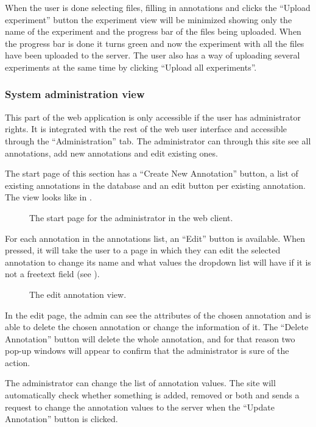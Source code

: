 When the user is done selecting files, filling in annotations and clicks the “Upload experiment” button the experiment view will be minimized showing only the name of the experiment and the progress bar of the files being uploaded. When the progress bar is done it turns green and now the experiment with all the files have been uploaded to the server. The user also has a way of uploading several experiments at the same time by clicking “Upload all experiments”. 

\subsubsection{System administration view}

This part of the web application is only accessible if the user has administrator rights. It is integrated with the rest of the web user interface and accessible through the “Administration” tab. The administrator can through this site see all annotations, add new annotations and edit existing ones.

The start page of this section has a “Create New Annotation” button, a list of existing annotations in the database and an edit button per existing annotation. The view looks like in . 

\begin{figure}[h]
 \caption{The start page for the administrator in the web client.}
 \label{adm__web_annotationView}
\end{figure}

For each annotation in the annotations list, an “Edit” button is available. When pressed, it will take the user to a page in which they can edit the selected annotation to change its name and what values the dropdown list will have if it is not a freetext field (see ). 

\begin{figure}[h]
 \caption{The edit annotation view.}
 \label{adm_web_editView}
\end{figure}
In the edit page, the admin can see the attributes of the chosen annotation and is able to delete the chosen annotation or change the information of it. The “Delete Annotation” button will delete the whole annotation, and for that reason two pop-up windows will appear to confirm that the administrator is sure of the action.

The administrator can change the list of annotation values. The site will automatically check whether something is added, removed or both and sends a request to change the annotation values to the server when the “Update Annotation” button is clicked.

